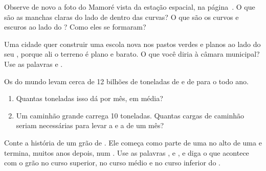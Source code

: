\begin{exercise}[$\star\star$]\label{exo:g5:water-shapes-the-land:8}
Observe de novo a foto do  Mamoré vista da estação espacial, na
página~\pageref{fig:g5:water-shapes-the-land:mamore}. O que são as manchas claras do lado de dentro
das curvas? O que são os  curvos e escuros ao lado do ? Como eles se formaram?
\end{exercise}

\begin{exercise}[$\star\star$]\label{exo:g5:water-shapes-the-land:9}
Uma cidade quer construir uma escola nova nos pastos verdes e planos ao
lado do seu , porque ali o terreno é plano e barato. O que você diria à
câmara municipal? Use as palavras \emph{} e \emph{}.
\end{exercise}

\begin{exercise}[$\star\star$]\label{exo:g5:water-shapes-the-land:10}
Os  do mundo levam cerca de 12 bilhões de toneladas de  e de 
para o  todo ano.
\begin{enumerate}
  \item[(a)] Quantas toneladas isso dá por mês, em média?
  \item[(b)] Um caminhão grande carrega 10 toneladas. Quantas cargas de
        caminhão seriam necessárias para levar a  e a  de um mês?
\end{enumerate}
\end{exercise}

\begin{exercise}[$\star\star\star$]\label{exo:g5:water-shapes-the-land:11}
Conte a história de um grão de . Ele começa como parte de uma 
no alto de uma  e termina, muitos anos depois, num . Use as
palavras \emph{}, \emph{} e \emph{}, e diga o
que acontece com o grão no curso superior, no curso médio e no curso
inferior do .
\end{exercise}
